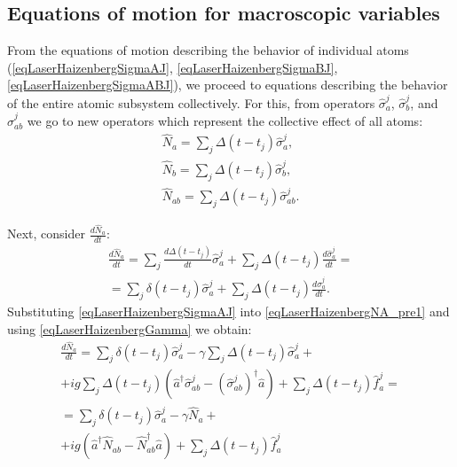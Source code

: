 \subsection{Equations of motion for macroscopic variables}
From the equations of motion describing the behavior of individual atoms
(\ref{eqLaserHaizenbergSigmaAJ}, \ref{eqLaserHaizenbergSigmaBJ},
\ref{eqLaserHaizenbergSigmaABJ}), we proceed to equations
describing the behavior of the entire atomic subsystem collectively. For this, from
operators $\hat{\sigma}^{j}_{a}$, $\hat{\sigma}^{j}_{b}$, and
$\hat{\sigma}^{j}_{ab}$ we go to new operators which
represent the collective effect of all atoms:
\begin{eqnarray}
\hat{N}_{a} = \sum_j \Delta\left(t - t_j\right)\hat{\sigma}^{j}_{a}, 
\nonumber \\
\hat{N}_{b} = \sum_j \Delta\left(t - t_j\right)\hat{\sigma}^{j}_{b}, 
\nonumber \\
\hat{N}_{ab} = \sum_j \Delta\left(t - t_j\right)\hat{\sigma}^{j}_{ab}.
\label{eqLaserHaizenbergSigmaMacroDef}
\end{eqnarray}

Next, consider $\frac{d \hat{N}_{a}}{d t}$:
\begin{eqnarray}
\frac{d \hat{N}_{a}}{d t} = 
\sum_j \frac{d \Delta\left(t - t_j\right)}{d t}\hat{\sigma}^{j}_{a} +
\sum_j \Delta\left(t - t_j\right)\frac{d \hat{\sigma}^{j}_{a}}{d t} = 
\nonumber \\
= \sum_j \delta\left(t - t_j\right)\hat{\sigma}^{j}_{a} + \sum_j
\Delta\left(t - t_j\right)\frac{d \hat{\sigma}^{j}_{a}}{d t}. 
\label{eqLaserHaizenbergNA_pre1}
\end{eqnarray}
Substituting \eqref{eqLaserHaizenbergSigmaAJ} into
\eqref{eqLaserHaizenbergNA_pre1} and using
\eqref{eqLaserHaizenbergGamma} we obtain:
\begin{eqnarray}
\frac{d \hat{N}_{a}}{d t} 
= \sum_j \delta\left(t - t_j\right)\hat{\sigma}^{j}_{a} - \gamma
\sum_j \Delta\left(t - t_j\right) \hat{\sigma}_{a}^{j} +
\nonumber \\
+
i g \sum_j
\Delta\left(t - t_j\right) 
 \left(
\hat{a}^{\dag}\hat{\sigma}^{j}_{ab} -
\left(\hat{\sigma}^{j}_{ab}\right)^{\dag}\hat{a}
\right) + \sum_j \Delta\left(t - t_j\right) \hat{f}_{a}^{j} = 
\nonumber \\
= 
\sum_j \delta\left(t - t_j\right)\hat{\sigma}^{j}_{a} - \gamma
\hat{N}_{a} + 
\nonumber \\ 
+ i g  \left(
\hat{a}^{\dag}\hat{N}_{ab} -
\hat{N}_{ab}^{\dag}\hat{a}
\right) + \sum_j \Delta\left(t - t_j\right) \hat{f}_{a}^{j}
\label{eqLaserHaizenbergNA_pre2}
\end{eqnarray}

